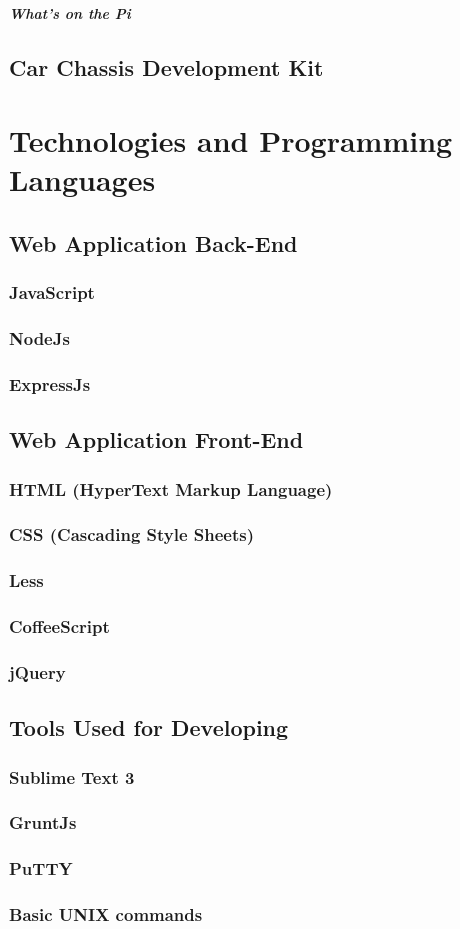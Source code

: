 \subparagraph{What’s on the Pi} 


\subsection{Car Chassis Development Kit}
  
   
\section{Technologies and Programming Languages}
\subsection{Web Application Back-End}
\subsubsection{JavaScript}
\subsubsection{NodeJs}
\subsubsection{ExpressJs}
\subsection{Web Application Front-End} 
\subsubsection{HTML (HyperText Markup Language)}
\subsubsection{CSS (Cascading Style Sheets)}
\subsubsection{Less}
\subsubsection{CoffeeScript}
\subsubsection{jQuery}
\subsection{Tools Used for Developing}
\subsubsection{Sublime Text 3}
\subsubsection{GruntJs}
\subsubsection{PuTTY}
\subsubsection{Basic UNIX commands }